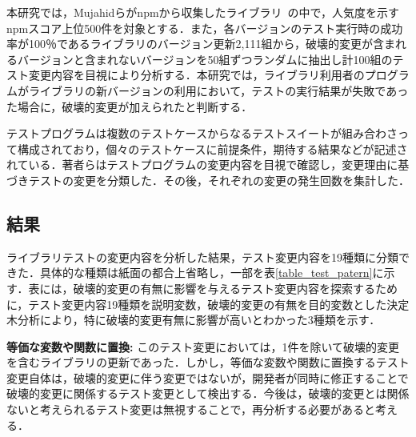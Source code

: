 \documentclass[uplatex,dvipdfmx,a4paper,twocolumn,base=11pt,jbase=11pt,ja=standard]{bxjsarticle}  %
\begin{document}
本研究では，Mujahidらがnpmから収集したライブラリ~\cite{Mujahid}の中で，人気度を示すnpmスコア上位500件を対象とする．また，各バージョンのテスト実行時の成功率が100％であるライブラリのバージョン更新2,111組から，破壊的変更が含まれるバージョンと含まれないバージョンを50組ずつランダムに抽出し計100組のテスト変更内容を目視により分析する．本研究では，ライブラリ利用者のプログラムがライブラリの新バージョンの利用において，テストの実行結果が失敗であった場合に，破壊的変更が加えられたと判断する．

%
%

テストプログラムは複数のテストケースからなるテストスイートが組み合わさって構成されており，個々のテストケースに前提条件，期待する結果などが記述されている．著者らはテストプログラムの変更内容を目視で確認し，変更理由に基づきテストの変更を分類した．その後，それぞれの変更の発生回数を集計した．



\subsection{結果}

ライブラリテストの変更内容を分析した結果，テスト変更内容を19種類に分類できた．具体的な種類は紙面の都合上省略し，一部を表\ref{table_test_patern}に示す．表には，破壊的変更の有無に影響を与えるテスト変更内容を探索するために，テスト変更内容19種類を説明変数，破壊的変更の有無を目的変数とした決定木分析により，特に破壊的変更有無に影響が高いとわかった3種類を示す．

\noindent\textbf{等価な変数や関数に置換: }このテスト変更においては，1件を除いて破壊的変更を含むライブラリの更新であった．しかし，等価な変数や関数に置換するテスト変更自体は，破壊的変更に伴う変更ではないが，開発者が同時に修正することで破壊的変更に関係するテスト変更として検出する．今後は，破壊的変更とは関係ないと考えられるテスト変更は無視することで，再分析する必要があると考える．
\end{document}
